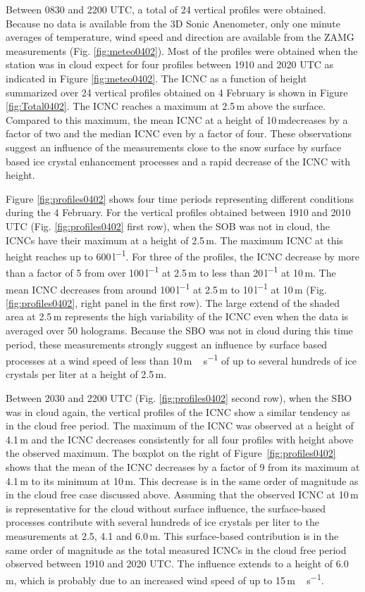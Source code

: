 \documentclass[draft,linenumbers]{agujournal}
\begin{document}
Between 0830 and 2200 UTC, a total of 24 vertical profiles were obtained. Because no data is available from the 3D Sonic Anenometer, only one minute averages of temperature, wind speed and direction are available from the ZAMG measurements (Fig. \ref{fig:meteo0402}). Most of the profiles were obtained when the station was in cloud expect for four profiles between 1910 and 2020 UTC as indicated in Figure \ref{fig:meteo0402}. The ICNC as a function of height summarized over 24 vertical profiles obtained on 4 February is shown in Figure \ref{fig:Total0402}. The ICNC reaches a maximum at 2.5\,\si{m} above the surface. Compared to this maximum, the mean ICNC at a height of 10\,\si{m}decreases by a factor of two and the median ICNC even by a factor of four. These observations suggest an influence of the measurements close to the snow surface by surface based ice crystal enhancement processes and a rapid decrease of the ICNC with height.

Figure \ref{fig:profiles0402} shows four time periods representing different conditions during the 4 February. For the vertical profiles obtained between 1910 and 2010 UTC (Fig. \ref{fig:profiles0402} first row), when the SOB was not in cloud, the ICNCs have their maximum at a height of 2.5\,\si{m}. The maximum ICNC at this height reaches up to 600\,\si{l^{-1}}. For three of the profiles, the ICNC decrease by more than a factor of 5 from over 100\,\si{l^{-1}} at 2.5\,\si{m} to less than 20\,\si{l^{-1}} at 10\,\si{m}. The mean ICNC decreases from around 100\,\si{l^{-1}} at 2.5\,\si{m} to 10\,\si{l^{-1}} at 10\,\si{m} (Fig. \ref{fig:profiles0402}, right panel in the first row). The large extend of the shaded area at 2.5\,\si{m} represents the high variability of the ICNC even when the data is averaged over 50 holograms. Because the SBO was not in cloud during this time period, these measurements strongly suggest an influence by surface based processes at a wind speed of less than 10\,\si{m\,s^{-1}} of up to several hundreds of ice crystals per liter at a height of 2.5\,\si{m}.

Between 2030 and 2200 UTC (Fig. \ref{fig:profiles0402} second row), when the SBO was in cloud again, the vertical profiles of the ICNC show a similar tendency as in the cloud free period. The maximum of the ICNC was observed at a height of 4.1\,\si{m} and the ICNC decreases consistently for all four profiles with height above the observed maximum. The boxplot on the right of Figure \,\ref{fig:profiles0402} shows that the mean of the ICNC decreases by a factor of 9 from its maximum at 4.1\,\si{m} to its minimum at 10\,\si{m}. This decrease is in the same order of magnitude as in the cloud free case discussed above. Assuming that the observed ICNC at 10\,\si{m} is representative for the cloud without surface influence, the surface-based processes contribute with several hundreds of ice crystals per liter to the measurements at 2.5, 4.1 and 6.0\,\si{m}. This surface-based contribution is in the same order of magnitude as the total measured ICNCs in the cloud free period observed between 1910 and 2020 UTC. The influence extends to a height of 6.0\,\si{m}, which is probably due to an increased wind speed of up to 15\,\si{m\,s^{-1}}. 
\end{document}
